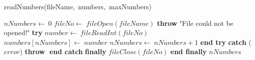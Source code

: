 \documentclass[a4paper,10pt]{article}
\begin{document}
\begin{algorithm}
\caption{readNumbers(fileName,\ numbers,\ maxNumbers)}
\begin{algorithmic}[5]

\STATE {}
\STATE {}
\STATE {}
  \STATE \(nNumbers\gets\ 0\)
  \STATE \(fileNo\gets\ fileOpen(fileName)\)
    \STATE \textbf{throw} \(\)"{}File could not be opened!"{}\(\)
  \ENDIF
  \STATE \textbf{try}  \BODY
      \STATE \(number\gets\ fileReadInt(fileNo)\)
      \STATE \(numbers[nNumbers]\gets\ number\)
      \STATE \(nNumbers\gets\ nNumbers+1\)
    \ENDWHILE
  \ENDBODY \STATE \textbf{end try}
  \STATE \textbf{catch} (\(error\)) \BODY
    \STATE \textbf{throw} \(\)
  \ENDBODY \STATE \textbf{end catch}
  \STATE \textbf{finally} \BODY
    \STATE \(fileClose(fileNo)\)
  \ENDBODY \STATE \textbf{end finally}
  \RETURN\(nNumbers\)

\end{algorithmic}
\end{algorithm}


\STATE {}
\end{document}
